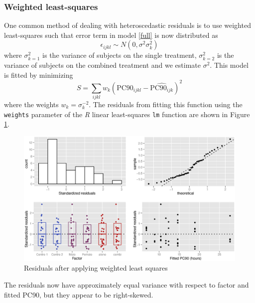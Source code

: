 \subsubsection*{Weighted least-squares}
One common method of dealing with heteroscedastic residuals is to use weighted least-squares such that error term in model \ref{full} is now distributed as 
\begin{equation}
\epsilon_{ijkl}\sim N(0,\sigma^2\sigma_{k}^{2})\label{wls}
\end{equation}
where $\sigma_{k=1}^{2}$ is the variance of subjects on the single treatment, $\sigma_{k=2}^{2}$ is the variance of subjects on the combined treatment and we estimate $\sigma^{2}$. This model is fitted by minimizing
\begin{equation*}
S=\sum_{ijkl} w_{k}(\mathrm{PC}90_{ijkl} - \widehat{\mathrm{PC}90_{ijk}})^{2}
\end{equation*}
where the weights $w_{k}=\sigma_{k}^{-2}$. The residuals from fitting this function using the \texttt{weights} parameter of the \emph{R} linear least-squares \texttt{lm} function are shown in Figure \ref{aovresw}.
\begin{figure}[p]
\includegraphics[width=150mm]{aovresw.eps} 
\caption{Residuals after applying weighted least squares}
\label{aovresw}
\end{figure}
The residuals now have approximately equal variance with respect to factor and fitted PC90, but they appear to be right-skewed.

